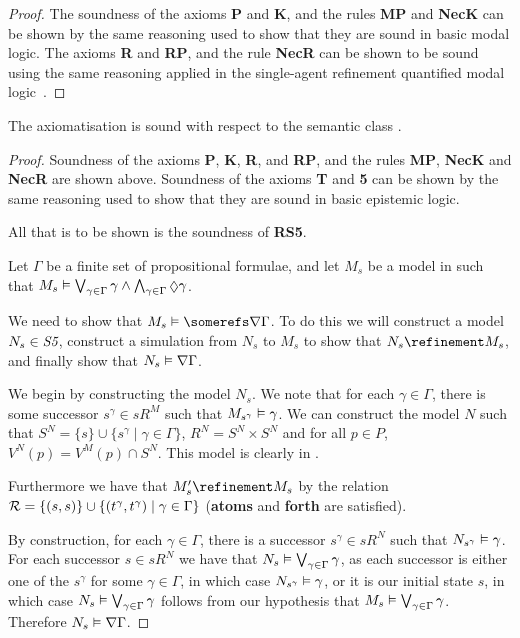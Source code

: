 \begin{proof}
The soundness of the axioms {\bf P} and {\bf K}, and the rules {\bf MP} and {\bf
NecK} can be shown by the same reasoning used to show that they are sound in
basic modal logic. The axioms {\bf R} and {\bf RP}, and the rule {\bf NecR} can
be shown to be sound using the same reasoning applied in the single-agent
refinement quantified modal logic~\cite{french2010future}.
\end{proof}

\begin{lemma}\label{single-sound-s5}
The axiomatisation \axiomSiF{} is sound with respect to the semantic class
\classSi{}.
\end{lemma}

\begin{proof}
Soundness of the axioms {\bf P}, {\bf K}, {\bf R}, and {\bf RP}, and the rules
{\bf MP}, {\bf NecK} and {\bf NecR} are shown above. Soundness of the axioms
{\bf T} and {\bf 5} can be shown by the same reasoning used to show that they
are sound in basic epistemic logic.

All that is to be shown is the soundness of {\bf RS5}.

Let $\Gamma$ be a finite set of propositional formulae, and let $M_s$ be a model in
\classS{} such that $M_s \entails \bigvee_{\gamma \in \Gamma} \gamma \land
\bigwedge_{\gamma \in \Gamma} \suspects \gamma$.

We need to show that $M_s \entails \somerefs \covers \Gamma$. To do this we will
construct a model $N_s \in \textit{S5}$, construct a simulation from $N_s$ to $M_s$
to show that $N_s \refinement M_s$, and finally show that $N_s \vDash
\nabla \Gamma$.

We begin by constructing the model $N_s$. We note that for each $\gamma \in
\Gamma$, there is some successor $s^\gamma \in sR^{M}$ such that $M_{s^\gamma}
\vDash \gamma$.  We can construct the model $N$ such that $S^{N} = \{s\} \cup
\{s^\gamma \mid \gamma \in \Gamma\}$, $R^{N} = S^{N} \times S^{N}$ and for all
$p \in P$, $V^{N}(p) = V^M(p) \cap S^{N}$. This model is clearly in \classS.

Furthermore we have that $M'_s \refinement M_s$ by the relation ${\cal
R} = \{(s, s)\} \cup \{(t^\gamma, t^\gamma) \mid \gamma \in \Gamma\}$
({\bf atoms} and {\bf forth} are satisfied). 

By construction, for each $\gamma \in \Gamma$, there is a successor $s^\gamma
\in sR^{N}$ such that $N_{s^\gamma} \vDash \gamma$. For each successor $s
\in sR^{N}$ we have that $N_s \vDash \bigvee_{\gamma \in \Gamma}
\gamma$, as each successor is either one of the $s^\gamma$ for some $\gamma \in
\Gamma$, in which case $N_{s^\gamma} \vDash \gamma$, or it is our initial
state $s$, in which case $N_s \vDash \bigvee_{\gamma \in \Gamma} \gamma$
follows from our hypothesis that $M_s \vDash \bigvee_{\gamma \in \Gamma}
\gamma$. Therefore $N_s \vDash \nabla \Gamma$.


\end{proof}
